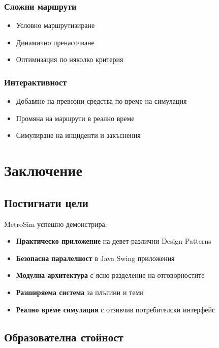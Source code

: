 \documentclass{article}
\begin{document}
\subsubsection{Сложни маршрути}
\begin{itemize}
	\item Условно маршрутизиране
	\item Динамично пренасочване
	\item Оптимизация по няколко критерия
\end{itemize}

\subsubsection{Интерактивност}
\begin{itemize}
	\item Добавяне на превозни средства по време на симулация
	\item Промяна на маршрути в реално време
	\item Симулиране на инциденти и закъснения
\end{itemize}

\section{Заключение}

\subsection{Постигнати цели}

MetroSim успешно демонстрира:

\begin{itemize}
	\item \textbf{Практическо приложение} на девет различни Design Patterns
	\item \textbf{Безопасна паралелност} в Java Swing приложения
	\item \textbf{Модулна архитектура} с ясно разделение на отговорностите
	\item \textbf{Разширяема система} за плъгини и теми
	\item \textbf{Реално време симулация} с отзивчив потребителски интерфейс
\end{itemize}

\subsection{Образователна стойност}
\end{document}

